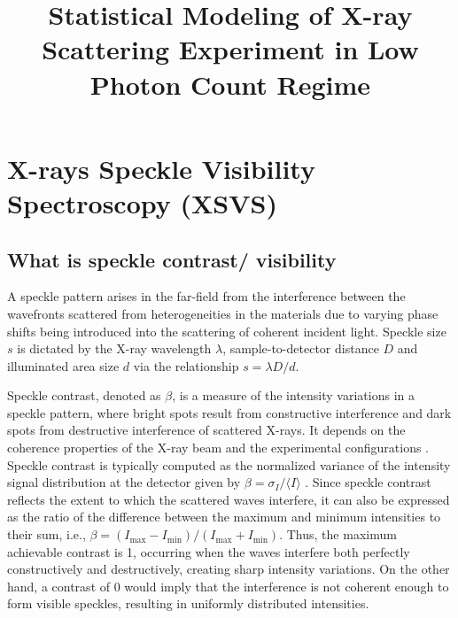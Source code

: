\documentclass[11pt]{article}
\theoremstyle{definition}
\begin{document}


\title{\LARGE {\textbf{Statistical Modeling of X-ray Scattering Experiment in Low Photon Count Regime}}}
\maketitle
\newpage
\section{X-rays Speckle Visibility Spectroscopy (XSVS)}
\subsection{What is speckle contrast/ visibility}
\label{subsec:speckle}
A speckle pattern arises in the far-field from the interference between the wavefronts scattered from heterogeneities in the materials due to varying phase shifts being introduced into the scattering of coherent incident light. Speckle size \(s\) is dictated by the X-ray wavelength \(\lambda\), sample-to-detector distance \(D\) and illuminated area size \(d\) via the relationship \(s = \lambda D/d \).  

Speckle contrast, denoted as $\beta$, is a measure of the intensity variations in a speckle pattern, where bright spots result from constructive interference and dark spots from destructive interference of scattered X-rays. It depends on the coherence properties of the X-ray beam and the experimental configurations \cite{hruszkewycz_high_2012}. 
Speckle contrast is typically computed as the normalized variance of the intensity signal distribution at the detector given by $\beta = \sigma_I/\langle I \rangle$ \cite{hruszkewycz_high_2012}. Since speckle contrast reflects the extent to which the scattered waves interfere, it can also be expressed as the ratio of the difference between the maximum and minimum intensities to their sum, i.e., \(\beta = (I_{\text{max}} - I_{\text{min}})/( I_{\text{max}} + I_{\text{min}})\). Thus, the maximum achievable contrast is 1, occurring when the waves interfere both perfectly constructively and destructively, creating sharp intensity variations. On the other hand, a contrast of 0 would imply that the interference is not coherent enough to form visible speckles, resulting in uniformly distributed intensities.
\end{document}
